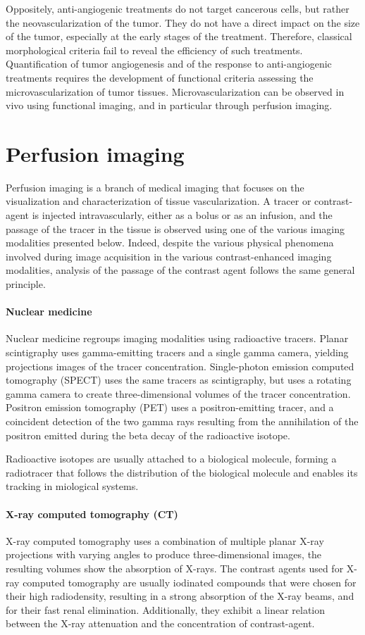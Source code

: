 Oppositely, anti-angiogenic treatments do not target cancerous cells, but rather the neovascularization of the tumor.
They do not have a direct impact on the size of the tumor, especially at the early stages of the treatment.
Therefore, classical morphological criteria fail to reveal the efficiency of such treatments.
Quantification of tumor angiogenesis and of the response to anti-angiogenic treatments requires the development of functional criteria assessing the microvascularization of tumor tissues.
Microvascularization can be observed in vivo using functional imaging, and in particular through perfusion imaging.

\section{Perfusion imaging}
\label{sec:IntroPerfusionImaging}
Perfusion imaging is a branch of medical imaging that focuses on the visualization and characterization of tissue vascularization.
A tracer or contrast-agent is injected intravascularly, either as a bolus or as an infusion, and the passage of the tracer in the tissue is observed using one of the various imaging modalities presented below.
Indeed, despite the various physical phenomena involved during image acquisition in the various contrast-enhanced imaging modalities, analysis of the passage of the contrast agent follows the same general principle.

\paragraph{Nuclear medicine}
\label{sec:IntroNM}
Nuclear medicine regroups imaging modalities using radioactive tracers. 
Planar scintigraphy uses gamma-emitting tracers and a single gamma camera, yielding projections images of the tracer concentration.
Single-photon emission computed tomography (SPECT) uses the same tracers as scintigraphy, but uses a rotating gamma camera to create three-dimensional volumes of the tracer concentration.
Positron emission tomography (PET) uses a positron-emitting tracer, and a coincident detection of the two gamma rays resulting from the annihilation of the positron emitted during the beta decay of the radioactive isotope.

Radioactive isotopes are usually attached to a biological molecule, forming a radiotracer that follows the distribution of the biological molecule and enables its tracking in miological systems.

\paragraph{X-ray computed tomography (CT)}
\label{sec:IntroCT}
X-ray computed tomography uses a combination of multiple planar X-ray projections with varying angles to produce three-dimensional images, the resulting volumes show the absorption of X-rays. 
The contrast agents used for X-ray computed tomography are usually iodinated compounds that were chosen for their high radiodensity, resulting in a strong absorption of the X-ray beams, and for their fast renal elimination.
Additionally, they exhibit a linear relation between the X-ray attenuation and the concentration of contrast-agent.

